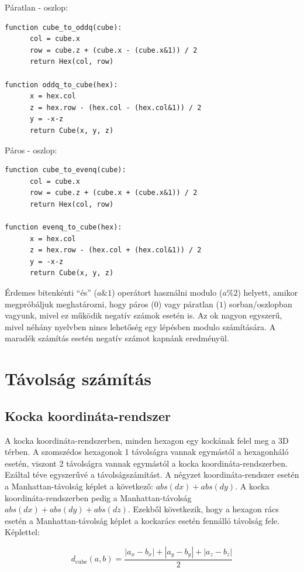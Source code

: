 Páratlan - oszlop:
\begin{verbatim}
function cube_to_oddq(cube):
      col = cube.x
      row = cube.z + (cube.x - (cube.x&1)) / 2
      return Hex(col, row)

function oddq_to_cube(hex):
      x = hex.col
      z = hex.row - (hex.col - (hex.col&1)) / 2
      y = -x-z
      return Cube(x, y, z)
\end{verbatim}

Páros - oszlop:
\begin{verbatim}
function cube_to_evenq(cube):
      col = cube.x
      row = cube.z + (cube.x + (cube.x&1)) / 2
      return Hex(col, row)

function evenq_to_cube(hex):
      x = hex.col
      z = hex.row - (hex.col + (hex.col&1)) / 2
      y = -x-z
      return Cube(x, y, z)
\end{verbatim}

\noindent Érdemes bitenkénti “és” ($a \& 1$) operátort használni modulo ($a \% 2$) helyett, amikor megpróbáljuk meghatározni, hogy páros ($0$) vagy páratlan ($1$) sorban/oszlopban vagyunk, mivel ez működik negatív számok esetén is. Az ok nagyon egyszerű, mivel néhány nyelvben nincs lehetőség egy lépésben modulo számítására. A maradék számítás esetén negatív számot kapnánk eredményül. 

\section{Távolság számítás}

\subsection{Kocka koordináta-rendszer}

A kocka koordináta-rendszerben, minden hexagon egy kockának felel meg a 3D térben. A szomszédos hexagonok 1 távolságra vannak egymástól a hexagonháló esetén, viszont 2 távolságra vannak egymástól a kocka koordináta-rendszerben. Ezáltal téve egyszerűvé a távolságszámítást. A négyzet koordináta-rendszer esetén a Manhattan-távolság képlet a következő: $abs(dx) + abs(dy)$. A kocka koordináta-rendszerben pedig a Manhattan-távolság $abs(dx) + abs(dy) + abs(dz)$. Ezekből következik, hogy a hexagon rács esetén a Manhattan-távolság képlet a kockarács esetén fennálló távolság fele.
\newline
\newline Képlettel:

$$
d_{\text{cube}}(a, b) =
\dfrac{|a_x - b_x| + |a_y - b_y| + |a_z - b_z|}{2}
$$

